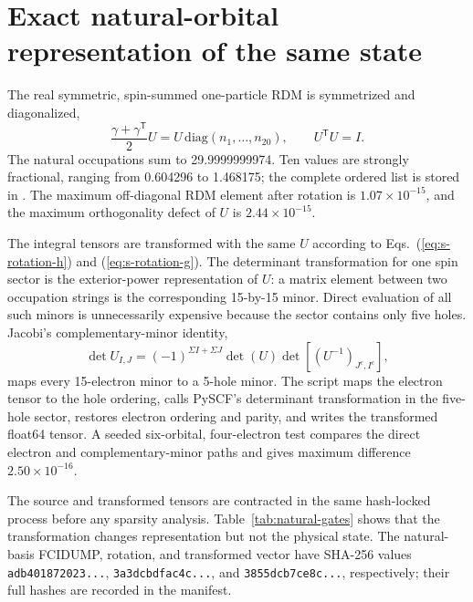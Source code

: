 \documentclass[aps,onecolumn,superscriptaddress,nofootinbib,longbibliography]{revtex4-2}
\begin{document}
\section{Exact natural-orbital representation of the same state}

The real symmetric, spin-summed one-particle RDM is symmetrized and
diagonalized,
\begin{equation}
 \frac{\gamma+\gamma^{\mathsf T}}{2}U
 =U\,\mathrm{diag}(n_1,\ldots,n_{20}),
 \qquad U^{\mathsf T}U=I.
\end{equation}
The natural occupations sum to 29.9999999974.  Ten values are strongly
fractional, ranging from 0.604296 to 1.468175; the complete ordered list is
stored in .  The maximum off-diagonal RDM
element after rotation is \(1.07\times10^{-15}\), and the maximum
orthogonality defect of \(U\) is \(2.44\times10^{-15}\).

The integral tensors are transformed with the same \(U\) according to
Eqs.~(\ref{eq:s-rotation-h}) and (\ref{eq:s-rotation-g}).  The determinant
transformation for one spin sector is
the exterior-power representation of \(U\): a matrix element between two
occupation strings is the corresponding 15-by-15 minor.  Direct evaluation of
all such minors is unnecessarily expensive because the sector contains only
five holes.  Jacobi's complementary-minor identity,
\begin{equation}
 \det U_{I,J}=(-1)^{\Sigma I+\Sigma J}\det(U)
 \det\!\left[(U^{-1})_{J^c,I^c}\right],
 \label{eq:jacobi}
\end{equation}
maps every 15-electron minor to a 5-hole minor.  The script
 maps the electron tensor to the
hole ordering, calls PySCF's determinant transformation in the five-hole
sector, restores electron ordering and parity, and writes the transformed
float64 tensor.  A seeded six-orbital, four-electron test compares the direct
electron and complementary-minor paths and gives maximum difference
\(2.50\times10^{-16}\).

The source and transformed tensors are contracted in the same hash-locked
process before any sparsity analysis.  Table~\ref{tab:natural-gates} shows that
the transformation changes representation but not the physical state.  The
natural-basis FCIDUMP, rotation, and transformed vector have SHA-256 values
\texttt{adb401872023...}, \texttt{3a3dcbdfac4c...}, and
\texttt{3855dcb7ce8c...}, respectively; their full hashes are recorded in the
manifest.
\end{document}
